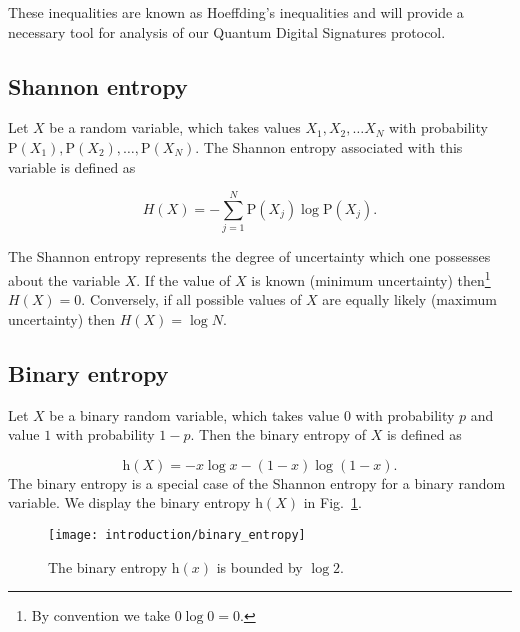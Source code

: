 \noindent These inequalities are known as Hoeffding's inequalities \cite{Hoeffding1963} and will provide a necessary tool for analysis of our Quantum Digital Signatures protocol.



\FloatBarrier
\subsection{Shannon entropy}\label{sec:intro_shannon_entropy}
Let $X$ be a random variable, which takes values $X_1, X_2, \dots X_N$ with probability $\text{P}\left(X_1\right), \text{P}\left(X_2\right),\dots,\text{P}\left(X_N\right)$. The Shannon entropy associated with this variable is defined as 

\begin{equation}
H\left(X\right) = - \sum_{j=1}^N \text{P}\left(X_j\right) \log \text{P}\left(X_j\right).
\end{equation}

\noindent The Shannon entropy represents the degree of uncertainty which one possesses about the variable $X$. If the value of $X$ is known (minimum uncertainty) then\footnote{By convention we take $0 \log 0 = 0$.} $H\left(X\right) = 0$. Conversely, if all possible values of $X$ are equally likely (maximum uncertainty) then $H\left(X\right) = \log N$.

\FloatBarrier
\subsection{Binary entropy}
Let $X$ be a binary random variable, which takes value $0$ with probability $p$ and value $1$ with probability $1-p$. Then the binary entropy of $X$ is defined as

\begin{equation}
\text{h}\left(X\right) = - x \log x - \left(1-x\right) \log \left(1-x\right).
\end{equation}
The binary entropy is a special case of the Shannon entropy for a binary random variable. We display the binary entropy $\text{h}\left(X\right)$ in Fig.~\ref{fig:binary_entropy}.

\begin{figure}
\centering
\captionsetup{width=0.8\linewidth}
\texttt{[image: introduction/binary\_entropy]}
\caption{\label{fig:binary_entropy} The binary entropy $\text{h}\left(x\right)$ is bounded by $\log 2$.}
\end{figure}


